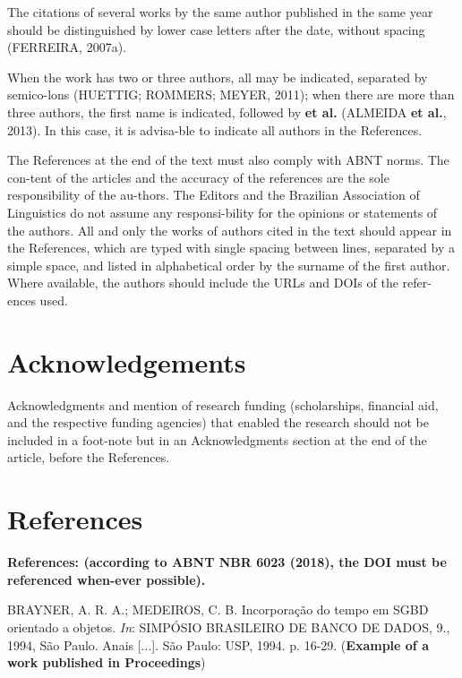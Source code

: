 \documentclass[12pt,a4paper]{article}
\begin{document}
The citations of several works by the same author published in the same year should be distinguished by lower case letters after the date, without spacing (FERREIRA, 2007a).

When the work has two or three authors, all may be indicated, separated by semico-lons (HUETTIG; ROMMERS; MEYER, 2011); when there are more than three authors, the first name is indicated, followed by \textbf{et al.} (ALMEIDA \textbf{et al.}, 2013). In this case, it is advisa-ble to indicate all authors in the References.

The References at the end of the text must also comply with ABNT norms. The con-tent of the articles and the accuracy of the references are the sole responsibility of the au-thors. The Editors and the Brazilian Association of Linguistics do not assume any responsi-bility for the opinions or statements of the authors. All and only the works of authors cited in the text should appear in the References, which are typed with single spacing between lines, separated by a simple space, and listed in alphabetical order by the surname of the first author. Where available, the authors should include the URLs and DOIs of the refer-ences used. 

\section*{Acknowledgements} 

Acknowledgments and mention of research funding (scholarships, financial aid, and the respective funding agencies) that enabled the research should not be included in a foot-note but in an Acknowledgments section at the end of the article, before the References.

\vspace{2cm}


\section*{References} 

\setlength{\parindent}{0em}

\textbf{References: (according to ABNT NBR 6023 (2018), the DOI must be referenced when-ever possible). 
}

BRAYNER, A. R. A.; MEDEIROS, C. B. Incorporação do tempo em SGBD orientado a objetos. \textit{In}: SIMPÓSIO BRASILEIRO DE BANCO DE DADOS, 9., 1994, São Paulo. Anais [...]. São Paulo: USP, 1994. p. 16-29. (\textbf{Example of a work published in Proceedings})
\vspace{0.5cm}
\end{document}
